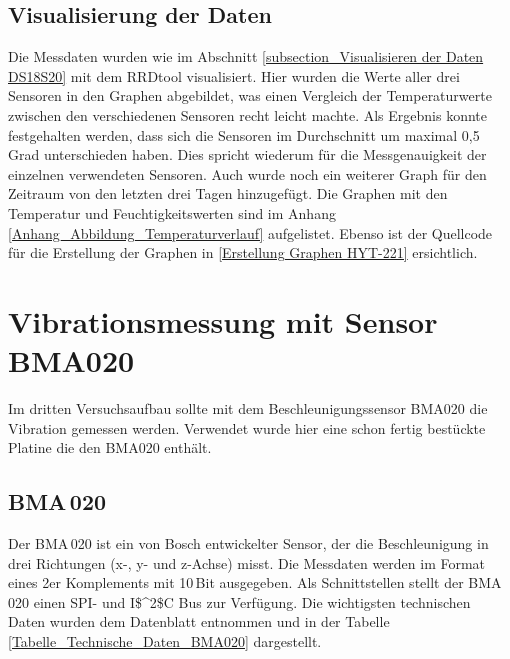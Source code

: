 \subsection{Visualisierung der Daten}
\label{subsection_Visualisierung der Daten}
Die Messdaten wurden wie im Abschnitt \ref{subsection_Visualisieren der Daten DS18S20} mit dem RRDtool visualisiert. Hier wurden die Werte aller drei Sensoren in den Graphen abgebildet, was einen Vergleich der Temperaturwerte zwischen den verschiedenen Sensoren recht leicht machte. Als Ergebnis konnte festgehalten werden, dass sich die Sensoren im Durchschnitt um maximal 0,5 Grad unterschieden haben. Dies spricht wiederum für die Messgenauigkeit der einzelnen verwendeten Sensoren. Auch wurde noch ein weiterer Graph für den Zeitraum von den letzten drei Tagen hinzugefügt. Die Graphen mit den Temperatur und Feuchtigkeitswerten sind im Anhang \ref{Anhang_Abbildung_Temperaturverlauf} aufgelistet. Ebenso ist der Quellcode für die Erstellung der Graphen in \ref{Erstellung Graphen HYT-221}  ersichtlich.\newpage


\section{Vibrationsmessung mit Sensor BMA020}
\label{section_BMA020}
Im dritten Versuchsaufbau sollte mit dem Beschleunigungssensor BMA020 die Vibration gemessen werden. Verwendet wurde hier eine schon fertig bestückte Platine die den BMA020 enthält.

\subsection{BMA\,020}
\label{subsection_BMA020}
Der BMA\,020 ist ein von Bosch entwickelter Sensor, der die Beschleunigung in drei Richtungen (x-, y- und z-Achse) misst. Die Messdaten werden im Format eines 2er Komplements mit 10\,Bit ausgegeben. Als Schnittstellen stellt der BMA\,020 einen SPI- und \ac{I$^2$C} Bus zur Verfügung. Die wichtigsten technischen Daten wurden dem Datenblatt \citep{Datenblatt_BMA020} entnommen und in der Tabelle \ref{Tabelle_Technische_Daten_BMA020} dargestellt.  

